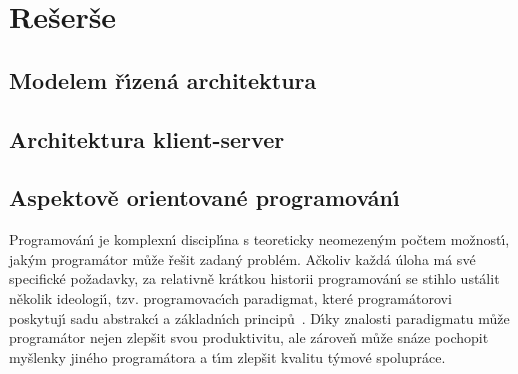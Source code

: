 
\chapter{Rešerše}\label{ch:reserse}

\section{Modelem ř\'{\i}zená architektura}


\section{Architektura klient-server}\label{sec:client-server}


\section{Aspektově orientované programován\'{\i}}

Programován\'{\i} je komplexn\'{\i} discipl\'{\i}na s teoreticky
neomezen\'ym počtem možnost\'{\i}, jak\'ym programátor může
řešit zadan\'y problém. Ačkoliv každá úloha má své specifické
požadavky, za relativně krátkou historii programován\'{\i} se
stihlo ustálit několik ideologi\'{\i}, tzv. programovac\'{\i}ch
paradigmat, které programátorovi poskytuj\'{\i} sadu abstrakc\'{\i}
a základn\'{\i}ch principů~\cite{van2009programming}.
D\'{\i}ky znalosti paradigmatu může programátor nejen zlepšit
svou produktivitu, ale zároveň může snáze pochopit myšlenky
jiného programátora a t\'{\i}m zlepšit kvalitu t\'ymové spolupráce.

